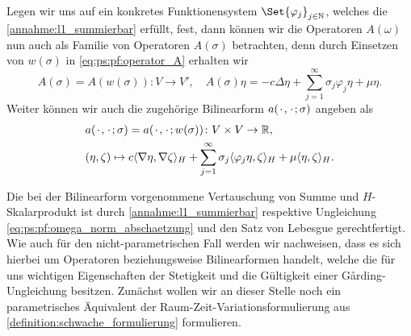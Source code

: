 Legen wir uns auf ein konkretes Funktionensystem $\Set{\varphi_{j}}_{j \in \mathbb{N}}$, welches die \cref{annahme:l1_summierbar} erfüllt, fest, dann können wir die Operatoren $A(\omega)$ nun auch als Familie von Operatoren $A(\sigma)$ betrachten, denn durch Einsetzen von $w(\sigma)$ in \cref{eq:ps:pf:operator_A} erhalten wir
\begin{equation}
\label{eq:ps:pf:operator_A_sigma}
    A(\sigma) = A(w(\sigma)) \colon V \to V', \quad A(\sigma) \eta = -c \Delta \eta + \sum_{j = 1}^{\infty} \sigma_{j} \varphi_{j} \eta + \mu \eta.
\end{equation}
Weiter können wir auch die zugehörige Bilinearform $a({\mkern2mu\cdot\mkern2mu}, {\mkern2mu\cdot\mkern2mu}; \sigma)$ angeben als
\begin{equation}
\label{eq:ps:pf:bilinearform_a_sigma}
    \begin{aligned}
    &a({\mkern2mu\cdot\mkern2mu}, {\mkern2mu\cdot\mkern2mu}; \sigma) = a({\mkern2mu\cdot\mkern2mu}, {\mkern2mu\cdot\mkern2mu}; w(\sigma)) \colon V \times V \to \mathbb{R}, \\
    &(\eta, \zeta) \mapsto c\langle\nabla \eta,\nabla \zeta\rangle_{H} + \sum_{j = 1}^{\infty} \sigma_{j} \langle\varphi_{j} \eta,\zeta\rangle_{H} + \mu \langle\eta,\zeta\rangle_{H}.
    \end{aligned}
\end{equation}

Die bei der Bilinearform vorgenommene Vertauschung von Summe und $H$-Skalarprodukt ist durch \cref{annahme:l1_summierbar} respektive Ungleichung \cref{eq:ps:pf:omega_norm_abschaetzung} und den Satz von Lebesgue gerechtfertigt.
Wie auch für den nicht-parametrischen Fall werden wir nachweisen, dass es sich hierbei um Operatoren beziehungsweise Bilinearformen handelt, welche die für uns wichtigen Eigenschaften der Stetigkeit und die Gültigkeit einer G\aa{}rding-Ungleichung besitzen.
Zunächst wollen wir an dieser Stelle noch ein parametrisches Äquivalent der Raum-Zeit-Variationsformulierung aus \cref{definition:schwache_formulierung} formulieren.

